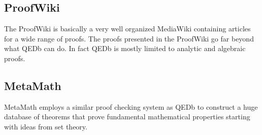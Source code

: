 \documentclass{article}
\begin{document}
\subsection{ProofWiki}
The ProofWiki is basically a very well organized MediaWiki containing articles for a wide range of proofs. The proofs presented in the ProofWiki go far beyond what QEDb can do. In fact QEDb is mostly limited to analytic and algebraic proofs.

\subsection{MetaMath}
MetaMath employs a similar proof checking system as QEDb to construct a huge database of theorems that prove fundamental mathematical properties starting with ideas from set theory.
\end{document}
